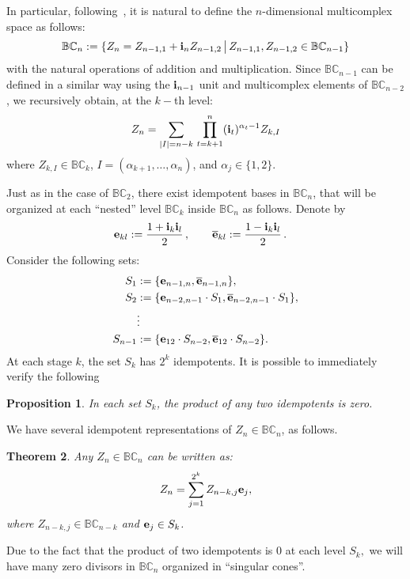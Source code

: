 \documentclass[reqno]{amsart}
\theoremstyle{plain}
\newtheorem{theorem}{Theorem}[section]
\newtheorem{proposition}[theorem]{Proposition}
\theoremstyle{definition}
\theoremstyle{remark}
\numberwithin{equation}{section}
\begin{document}
In particular, following~\cite{price}, it is natural to define the
$n$-dimensional multicomplex space as follows:
$$
{{\mathbb B}{\mathbb C}}_n:=\{Z_n=Z_{n-1,1}+{{\bf i}}_nZ_{n-1,2}\,\big|\,Z_{n-1,1},Z_{n-1,2}\in{{\mathbb B}{\mathbb C}}_{n-1}\}
$$
with the natural operations of addition and multiplication. Since
${{\mathbb B}{\mathbb C}}_{n-1}$ can be defined in a similar way using the ${{\bf i}}_{n-1}$ unit
and multicomplex elements of ${{\mathbb B}{\mathbb C}}_{n-2}$, we recursively obtain, at
the $k-$th level:
$$
Z_n=\sum_{|I|=n-k}\,\prod_{t=k+1}^{n} ({{\bf i}}_t)^{\alpha_t-1} Z_{k,I}
$$
where $Z_{k,I}\in{{\mathbb B}{\mathbb C}}_k$, $I=(\alpha_{k+1},\dots,\alpha_n)$, and
$\alpha_j\in\{1,2\}$.

\medskip

Just as in the case of ${{\mathbb B}{\mathbb C}}_2$, there exist idempotent bases in
${{\mathbb B}{\mathbb C}}_n$, that will be organized at each ``nested'' level ${{\mathbb B}{\mathbb C}}_k$
inside ${{\mathbb B}{\mathbb C}}_n$ as follows.  Denote by
\begin{align*}
  {{\bf e}}_{kl} &:= \frac{1+{{\bf i}}_k{{\bf i}}_l}{2}\,,\qquad
  {{\overline{{{\bf e}}}}}_{kl} := \frac{1-{{\bf i}}_k{{\bf i}}_l}{2}\,.
\end{align*}
Consider the following sets:
\begin{align*}
  S_1 &:= \{{{\bf e}}_{n-1,n}, {{\overline{{{\bf e}}}}}_{n-1,n}\},\\
  S_2 &:= \{{{\bf e}}_{n-2,n-1}\cdot S_1, {{\overline{{{\bf e}}}}}_{n-2,n-1}\cdot S_1\},\\
  &\vdots\\
  S_{n-1} &:= \{{{\bf e}}_{12}\cdot S_{n-2}, {{\overline{{{\bf e}}}}}_{12}\cdot S_{n-2}\}.
\end{align*}
At each stage $k$, the set $S_k$ has $2^k$ idempotents.  It is
possible to immediately verify the following
\begin{proposition}
  In each set $S_k$, the product of any two idempotents is zero.
\end{proposition}
We have several idempotent representations of $Z_n\in{{\mathbb B}{\mathbb C}}_n$, as follows.
\begin{theorem}
  Any $Z_n\in{{\mathbb B}{\mathbb C}}_n$ can be written as:
  $$
  Z_n=\sum_{j=1}^{2^k} Z_{n-k,j}{{\bf e}}_j,
  $$
  where $Z_{n-k,j}\in{{\mathbb B}{\mathbb C}}_{n-k}$ and ${{\bf e}}_j\in S_k$.
\end{theorem}

Due to the fact that the product of two idempotents is $0$ at each
level $S_k,$ we will have many zero divisors in ${{\mathbb B}{\mathbb C}}_n$ organized in
``singular cones''.
\end{document}
